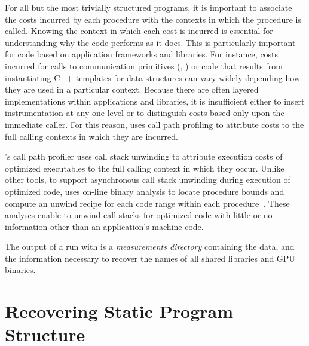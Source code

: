 \documentclass[11pt,twoside,letterpaper]{report}
\begin{document}
For all but the most trivially structured programs, it is important to associate the costs incurred by each procedure with the contexts in which the procedure is called.
Knowing the context in which each cost is incurred is essential for understanding why the code performs as it does.
This is particularly important for code based on application frameworks and libraries.
For instance, costs incurred for calls to communication primitives (\eg{}, ) or code that results from instantiating C++ templates for data structures can vary widely depending how they are used in a particular context.
Because there are often layered implementations within applications and libraries, it is insufficient either to insert instrumentation at any one level or to distinguish costs based only upon the immediate caller.
For this reason, \HPCToolkit{} uses call path profiling to attribute costs to the full calling contexts in which they are incurred.

\HPCToolkit{}'s \hpcrun{} call path profiler uses call stack unwinding to attribute execution costs of optimized executables to the full calling context in which they occur.
Unlike other tools, to support asynchronous call stack unwinding during execution of optimized code, \hpcrun{} uses on-line binary analysis to locate procedure bounds and compute an unwind recipe for each code range within each procedure~\cite{Tallent-MC-Fagan:2009:PLDI-hpctoolkit-binary-analysis}.
These analyses enable \hpcrun{} to unwind call stacks for optimized code with little or no information other than an application's machine code.

\begin{comment}
To attribute performance back to source code, \HPCToolkit{} combines a call path profile with information gleaned
through post-mortem analysis of an application's object code and its debugging sections.
This post-mortem analysis of an executable recovers its program structure and reconstructs a mapping from
instructions back to source lines, loops, inlined functions, and procedures.
\HPCToolkit{}'s ability to attribute costs to dynamic call paths, including loops and inlined functions,
for optimized code without a special-purpose compiler is unique.
\end{comment}

The output of a run with  \hpcrun{} is a \emph{measurements directory} containing the data, and the information necessary
to recover the names of all shared libraries and GPU binaries.


\section{Recovering Static Program Structure}
\end{document}
